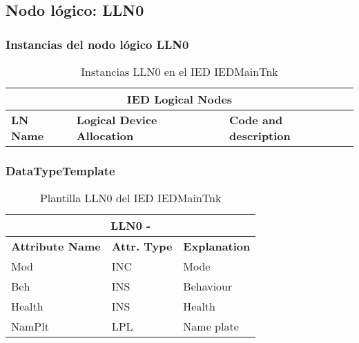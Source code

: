 
\subsection{Nodo l\'ogico: 			 LLN0}

    \subsubsection{Instancias del nodo l\'ogico LLN0}
    \begin{table}[H]
    \begin{center}
    \begin{tabular}{|l|l|p{6.8cm}|}
            \hline
            \multicolumn{3}{|c|}{\cellcolor[gray]{0.8} \textbf{IED Logical Nodes} } \\
            \hline
            \textbf{LN Name} & \textbf{Logical Device Allocation} & \textbf{Code and description} \\
            \hline
    \end{tabular}
    \caption{Instancias LLN0 en el IED IEDMainTnk}
    \label{table:lnInstLLN0_1}
    \end{center}
    \end{table}
    
    
    
    \subsubsection{DataTypeTemplate}
    \begin{table}[H]
    \begin{center}
    \begin{tabular}{|l|l|p{8.5cm}|}
            \hline
            \multicolumn{3}{|c|}{\cellcolor[gray]{0.8} \textbf{ LLN0}  -  } \\
            \hline
            \textbf{Attribute Name} & \textbf{Attr. Type} & \textbf{Explanation} \\
            \hline 
            Mod & INC & Mode \\
            \hline
            Beh & INS & Behaviour \\
            \hline
            Health & INS & Health \\
            \hline
            NamPlt & LPL & Name plate \\
            \hline
    \end{tabular}
    \caption{Plantilla LLN0 del IED IEDMainTnk}
    \label{table:lnTypeLLN0_1}
    \end{center}
    \end{table}
    
    
    